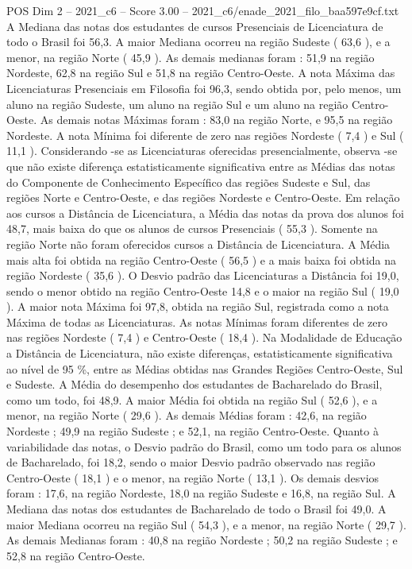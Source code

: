 \begin{textsample}{POS Dim 2 – 2021\_c6 – Score 3.00 – 2021\_c6/enade\_2021\_filo\_baa597e9cf.txt}
A Mediana das notas dos estudantes de cursos Presenciais de Licenciatura de todo o Brasil foi 56,3.
A maior Mediana ocorreu na região Sudeste ( 63,6 ), e a menor, na região Norte ( 45,9 ).
As demais medianas foram : 51,9 na região Nordeste, 62,8 na região Sul e 51,8 na região Centro-Oeste.
A nota Máxima das Licenciaturas Presenciais em Filosofia foi 96,3, sendo obtida por, pelo menos, um aluno na região Sudeste, um aluno na região Sul e um aluno na região Centro-Oeste.
As demais notas Máximas foram : 83,0 na região Norte, e 95,5 na região Nordeste.
A nota Mínima foi diferente de zero nas regiões Nordeste ( 7,4 ) e Sul ( 11,1 ).
Considerando -se as Licenciaturas oferecidas presencialmente, observa -se que não existe diferença estatisticamente significativa entre as Médias das notas do Componente de Conhecimento Específico das regiões Sudeste e Sul, das regiões Norte e Centro-Oeste, e das regiões Nordeste e Centro-Oeste.
Em relação aos cursos a Distância de Licenciatura, a Média das notas da prova dos alunos foi 48,7, mais baixa do que os alunos de cursos Presenciais ( 55,3 ).
Somente na região Norte não foram oferecidos cursos a Distância de Licenciatura.
A Média mais alta foi obtida na região Centro-Oeste ( 56,5 ) e a mais baixa foi obtida na região Nordeste ( 35,6 ).
O Desvio padrão das Licenciaturas a Distância foi 19,0, sendo o menor obtido na região Centro-Oeste 14,8 e o maior na região Sul ( 19,0 ).
A maior nota Máxima foi 97,8, obtida na região Sul, registrada como a nota Máxima de todas as Licenciaturas.
As notas Mínimas foram diferentes de zero nas regiões Nordeste ( 7,4 ) e Centro-Oeste ( 18,4 ).
Na Modalidade de Educação a Distância de Licenciatura, não existe diferenças, estatisticamente significativa ao nível de 95 \%, entre as Médias obtidas nas Grandes Regiões Centro-Oeste, Sul e Sudeste.
A Média do desempenho dos estudantes de Bacharelado do Brasil, como um todo, foi 48,9.
A maior Média foi obtida na região Sul ( 52,6 ), e a menor, na região Norte ( 29,6 ).
As demais Médias foram : 42,6, na região Nordeste ; 49,9 na região Sudeste ; e 52,1, na região Centro-Oeste.
Quanto à variabilidade das notas, o Desvio padrão do Brasil, como um todo para os alunos de Bacharelado, foi 18,2, sendo o maior Desvio padrão observado nas região Centro-Oeste ( 18,1 ) e o menor, na região Norte ( 13,1 ).
Os demais desvios foram : 17,6, na região Nordeste, 18,0 na região Sudeste e 16,8, na região Sul.
A Mediana das notas dos estudantes de Bacharelado de todo o Brasil foi 49,0.
A maior Mediana ocorreu na região Sul ( 54,3 ), e a menor, na região Norte ( 29,7 ).
As demais Medianas foram : 40,8 na região Nordeste ; 50,2 na região Sudeste ; e 52,8 na região Centro-Oeste.

\end{textsample}
